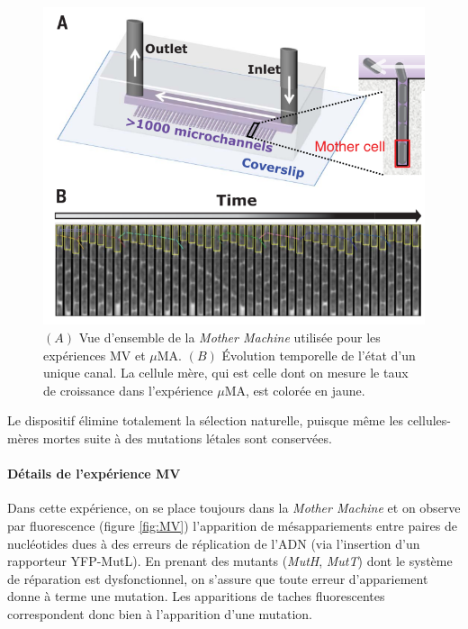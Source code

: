 \documentclass[12pt]{article}
\begin{document}
\begin{figure}[h]
  \begin{center}
    \vspace{3mm}
    \includegraphics[scale=0.4]{../Img/Schema_microMA.png}
  \end{center} 
  \caption{\label{fig:microMA}$(A)$ Vue d'ensemble de la \emph{Mother Machine} utilisée pour les expériences MV et $\mu$MA. $(B)$ Évolution temporelle de l'état d'un unique canal. La cellule mère, qui est celle dont on mesure le taux de croissance dans l'expérience $\mu$MA, est colorée en jaune.}
\end{figure}

Le dispositif élimine totalement la sélection naturelle, puisque même les cellules-mères mortes suite à des mutations létales sont conservées.

\paragraph{Détails de l'expérience MV}

Dans cette expérience, on se place toujours dans la \emph{Mother Machine} et on observe par fluorescence (figure \ref{fig:MV}) l'apparition de mésappariements entre paires de nucléotides dues à des erreurs de réplication de l'ADN (via l'insertion d'un rapporteur YFP-MutL). En prenant des mutants (\emph{MutH}, \emph{MutT}) dont le système de réparation est dysfonctionnel, on s'assure que toute erreur d'appariement donne à terme une mutation. Les apparitions de taches fluorescentes correspondent donc bien à l'apparition d'une mutation.
\end{document}
